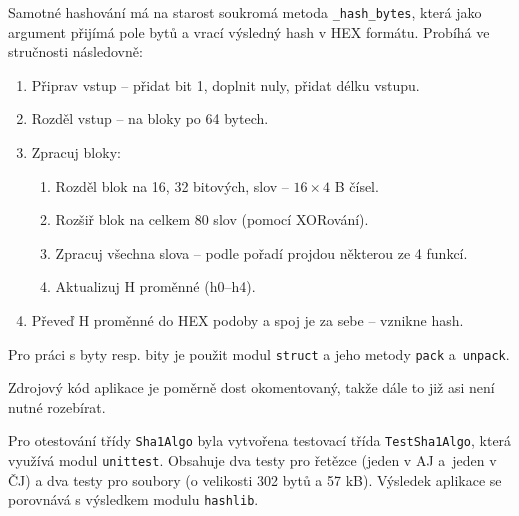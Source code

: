 \documentclass[a4paper]{article}
\begin{document}
Samotné hashování má na starost soukromá metoda \verb|_hash_bytes|, která jako argument přijímá pole bytů a vrací výsledný hash v HEX formátu. Probíhá ve stručnosti následovně:
\begin{enumerate}
\item Připrav vstup -- přidat bit 1, doplnit nuly, přidat délku vstupu.
\item Rozděl vstup -- na bloky po 64 bytech.
\item Zpracuj bloky:
	\begin{enumerate}
	\item Rozděl blok na 16, 32 bitových, slov -- $16\times4$ B čísel.
	\item Rozšiř blok na celkem 80 slov (pomocí XORování).
	\item Zpracuj všechna slova -- podle pořadí projdou některou ze 4 funkcí.
	\item Aktualizuj H proměnné (h0--h4).
	\end{enumerate}
\item Převeď H proměnné do HEX podoby a spoj je za sebe -- vznikne hash.
\end{enumerate}

Pro práci s byty resp. bity je použit modul \texttt{struct} a jeho metody \texttt{pack} a~\texttt{unpack}.

Zdrojový kód aplikace je poměrně dost okomentovaný, takže dále to již asi není nutné rozebírat.

Pro otestování třídy \texttt{Sha1Algo} byla vytvořena testovací třída \texttt{TestSha1Algo}, která využívá modul \texttt{unittest}. Obsahuje dva testy pro řetězce (jeden v AJ a~jeden v ČJ) a dva testy pro soubory (o velikosti 302 bytů a 57 kB). 
Výsledek aplikace se porovnává s výsledkem modulu \verb|hashlib|. 
\end{document}
